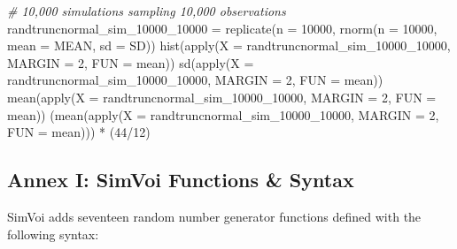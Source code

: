 \documentclass[
]{article}
\newenvironment{Shaded}{}{}
\newcommand{\AttributeTok}[1]{\textcolor[rgb]{0.49,0.56,0.16}{#1}}
\newcommand{\CommentTok}[1]{\textcolor[rgb]{0.38,0.63,0.69}{\textit{#1}}}
\newcommand{\DecValTok}[1]{\textcolor[rgb]{0.25,0.63,0.44}{#1}}
\newcommand{\FunctionTok}[1]{\textcolor[rgb]{0.02,0.16,0.49}{#1}}
\newcommand{\NormalTok}[1]{#1}
\newcommand{\OtherTok}[1]{\textcolor[rgb]{0.00,0.44,0.13}{#1}}
\newcommand{\SpecialCharTok}[1]{\textcolor[rgb]{0.25,0.44,0.63}{#1}}
\begin{document}
\begin{Shaded}
\begin{Highlighting}[numbers=left,,]
\CommentTok{\# 10,000 simulations sampling 10,000 observations}
\NormalTok{randtruncnormal\_sim\_10000\_10000 }\OtherTok{=} \FunctionTok{replicate}\NormalTok{(}\AttributeTok{n =} \DecValTok{10000}\NormalTok{, }\FunctionTok{rnorm}\NormalTok{(}\AttributeTok{n =} \DecValTok{10000}\NormalTok{, }\AttributeTok{mean =}\NormalTok{ MEAN,}
    \AttributeTok{sd =}\NormalTok{ SD))}
\FunctionTok{hist}\NormalTok{(}\FunctionTok{apply}\NormalTok{(}\AttributeTok{X =}\NormalTok{ randtruncnormal\_sim\_10000\_10000, }\AttributeTok{MARGIN =} \DecValTok{2}\NormalTok{, }\AttributeTok{FUN =}\NormalTok{ mean))}
\FunctionTok{sd}\NormalTok{(}\FunctionTok{apply}\NormalTok{(}\AttributeTok{X =}\NormalTok{ randtruncnormal\_sim\_10000\_10000, }\AttributeTok{MARGIN =} \DecValTok{2}\NormalTok{, }\AttributeTok{FUN =}\NormalTok{ mean))}
\FunctionTok{mean}\NormalTok{(}\FunctionTok{apply}\NormalTok{(}\AttributeTok{X =}\NormalTok{ randtruncnormal\_sim\_10000\_10000, }\AttributeTok{MARGIN =} \DecValTok{2}\NormalTok{, }\AttributeTok{FUN =}\NormalTok{ mean))}
\NormalTok{(}\FunctionTok{mean}\NormalTok{(}\FunctionTok{apply}\NormalTok{(}\AttributeTok{X =}\NormalTok{ randtruncnormal\_sim\_10000\_10000, }\AttributeTok{MARGIN =} \DecValTok{2}\NormalTok{, }\AttributeTok{FUN =}\NormalTok{ mean))) }\SpecialCharTok{*}\NormalTok{ (}\DecValTok{44}\SpecialCharTok{/}\DecValTok{12}\NormalTok{)}
\end{Highlighting}
\end{Shaded}

\subsection{Annex I: SimVoi Functions \&
Syntax}\label{annex-i-simvoi-functions-syntax}

SimVoi adds seventeen random number generator functions defined with the
following syntax:
\end{document}
